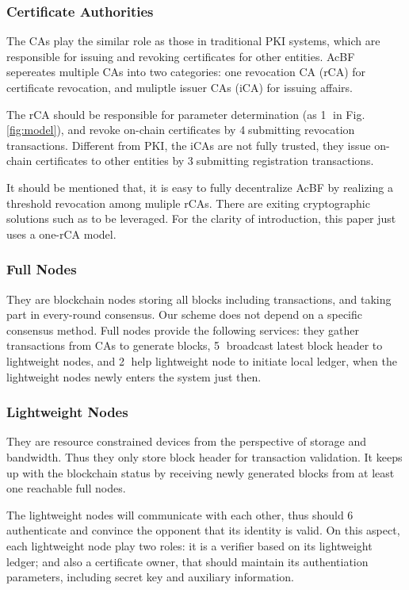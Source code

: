\documentclass[conference]{IEEEtran}
\begin{document}
\subsubsection{Certificate Authorities}
 The CAs play the similar role as those in traditional PKI systems, which are responsible for issuing and revoking certificates for other entities. AcBF sepereates multiple CAs into two categories: one revocation CA (rCA) for certificate revocation, and muliptle issuer CAs (iCA) for issuing affairs. 
 
 The rCA should be responsible for parameter determination (as \textcircled{1} in Fig. \ref{fig:model}), and revoke on-chain certificates by \textcircled{4}submitting revocation transactions. Different from PKI, the iCAs are not fully trusted, they issue on-chain certificates to other entities by \textcircled{3}submitting registration transactions. 

It should be mentioned that, it is easy to fully decentralize AcBF by realizing a threshold revocation among muliple rCAs. There are exiting cryptographic solutions such as \cite{Gennaro2019FullyDG} to be leveraged. 
For the clarity of introduction, this paper just uses a one-rCA model. 

\subsubsection{Full Nodes}
They are blockchain nodes storing all blocks including transactions, and taking part in every-round consensus. Our scheme does not depend on a specific consensus method. Full nodes provide the following services: they gather transactions from CAs to generate blocks, \textcircled{5} broadcast latest block header to lightweight nodes, and \textcircled{2} help lightweight node to initiate local ledger,  when the lightweight nodes newly enters the system just then. 

\subsubsection{Lightweight Nodes}
They are resource constrained devices from the perspective of storage and bandwidth. Thus they only store block header for transaction validation. 
It keeps up with the blockchain status by receiving newly generated blocks from at least one reachable full nodes. 

The lightweight nodes will communicate with each other, thus should \textcircled{6} authenticate and convince the opponent that its identity is valid. On this aspect, each lightweight node play two roles: it is a verifier based on its lightweight ledger; and also a certificate owner, that should maintain its authentiation parameters, including secret key and auxiliary information.
\end{document}
